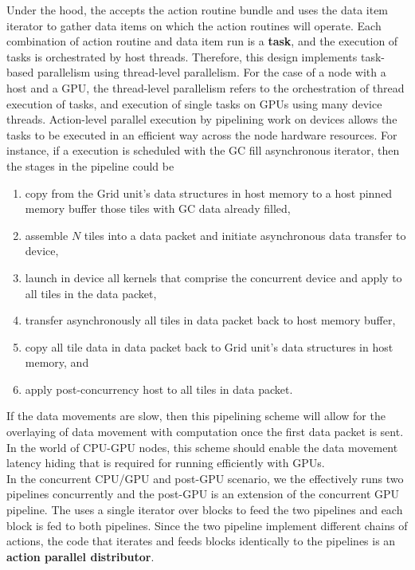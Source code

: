 \documentclass{article}
\begin{document}
Under the hood, the \OR accepts the action routine bundle and uses the data item
iterator to gather data items on which the action routines will operate.  Each
combination of action routine and data item run is a \textbf{task}, and the execution of tasks
is orchestrated by host threads.  Therefore, this design implements task-based
parallelism using thread-level parallelism.  For the case of a node with a
host and a GPU, the thread-level parallelism refers to the orchestration of thread
execution of tasks, and execution of single tasks
on GPUs using many device threads.  Action-level parallel execution by pipelining
work on devices allows the tasks to be executed in an efficient way
across the node hardware resources.  For instance, if a \OR execution is
scheduled with the GC fill asynchronous iterator, then the stages in the
pipeline could be
\begin{enumerate}
\item{copy from the Grid unit's data structures in host memory to a host pinned memory
buffer those tiles with GC data already filled,}
\item{assemble $N$ tiles into a data packet and initiate asynchronous data
transfer to device,}
\item{launch in device all kernels that comprise the concurrent device \actionroutine and
apply to all tiles in the data packet,}
\item{transfer asynchronously all tiles in data packet back to host memory
buffer,}
\item{copy all tile data in data packet back to Grid unit's data structures in
host memory, and}
\item{apply post-concurrency host \actionroutine to all tiles in data packet.}
\end{enumerate}
If the data movements are slow, then this pipelining scheme
will allow for the overlaying of data movement with computation once the first
data packet is sent.  In the world of CPU-GPU nodes, this scheme should
enable the data movement latency hiding that is required for running efficiently
with GPUs.\\

In the concurrent CPU/GPU and post-GPU scenario, we the \OR
effectively runs two pipelines concurrently and the post-GPU \actionroutine is
an extension of the concurrent GPU \actionroutine pipeline.  The \OR uses a single
iterator over blocks to feed the two pipelines
and each block is fed to both pipelines.  Since the two pipeline implement
different chains of actions, the code that iterates and feeds
blocks identically to the pipelines is an \textbf{action parallel distributor}.\\
\end{document}
